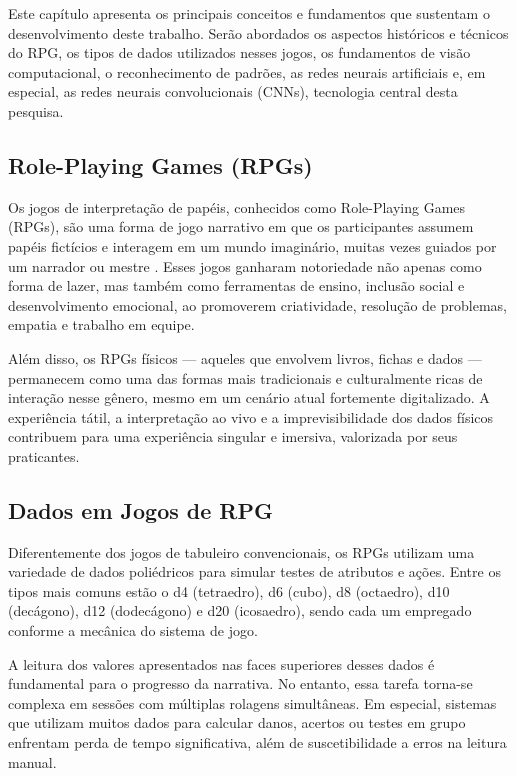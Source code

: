 Este capítulo apresenta os principais conceitos e fundamentos
que sustentam o desenvolvimento deste trabalho. Serão abordados
os aspectos históricos e técnicos do RPG, os tipos de dados
utilizados nesses jogos, os fundamentos de visão computacional,
o reconhecimento de padrões, as redes neurais artificiais e,
em especial, as redes neurais convolucionais (CNNs), tecnologia
central desta pesquisa.

\subsection{Role-Playing Games (RPGs)}

Os jogos de interpretação de papéis, conhecidos como Role-Playing
Games (RPGs), são uma forma de jogo narrativo em que os
participantes assumem papéis fictícios e interagem em um mundo
imaginário, muitas vezes guiados por um narrador ou mestre
\cite{hitchens2007roleplaying}. Esses jogos ganharam notoriedade
não apenas como forma de lazer, mas também como ferramentas de
ensino, inclusão social e desenvolvimento emocional, ao promoverem
criatividade, resolução de problemas, empatia e trabalho em equipe.

Além disso, os RPGs físicos — aqueles que envolvem livros, fichas
e dados — permanecem como uma das formas mais tradicionais e
culturalmente ricas de interação nesse gênero, mesmo em um cenário
atual fortemente digitalizado. A experiência tátil, a interpretação
ao vivo e a imprevisibilidade dos dados físicos contribuem para
uma experiência singular e imersiva, valorizada por seus praticantes.

\subsection{Dados em Jogos de RPG}

Diferentemente dos jogos de tabuleiro convencionais, os RPGs
utilizam uma variedade de dados poliédricos para simular testes
de atributos e ações. Entre os tipos mais comuns estão o d4
(tetraedro), d6 (cubo), d8 (octaedro), d10 (decágono), d12
(dodecágono) e d20 (icosaedro), sendo cada um empregado conforme
a mecânica do sistema de jogo.

A leitura dos valores apresentados nas faces superiores desses
dados é fundamental para o progresso da narrativa. No entanto,
essa tarefa torna-se complexa em sessões com múltiplas rolagens
simultâneas. Em especial, sistemas que utilizam muitos dados para
calcular danos, acertos ou testes em grupo enfrentam perda de tempo
significativa, além de suscetibilidade a erros na leitura manual.

